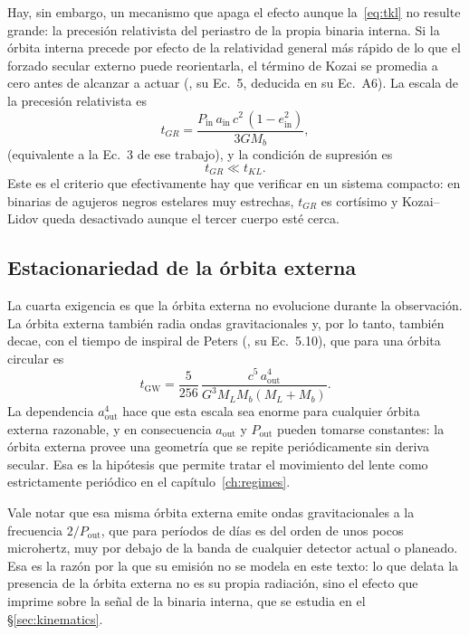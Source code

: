 \documentclass[11pt,a4paper,openany]{book}
\newcommand{\ain}{a_{\mathrm{in}}}
\newcommand{\aout}{a_{\mathrm{out}}}
\begin{document}
Hay, sin embargo, un mecanismo que apaga el efecto aunque
la~\eqref{eq:tkl} no resulte grande: la precesi\'on relativista del periastro
de la propia binaria interna. Si la \'orbita interna precede por efecto de la
relatividad general m\'as r\'apido de lo que el forzado secular externo puede
reorientarla, el t\'ermino de Kozai se promedia a cero antes de alcanzar a
actuar (\citealp{BlaesLeeSocrates2002}, su Ec.~5, deducida en su
Ec.~A6). La escala de la precesi\'on relativista es
\begin{equation}
  t_{GR}=\frac{P_\mathrm{in}\,\ain\,c^{2}\,(1-e_\mathrm{in}^{2})}{3GM_b},
  \label{eq:tgr}
\end{equation}
(equivalente a la Ec.~3 de ese trabajo), y la condici\'on de supresi\'on es
\begin{equation}
  t_{GR}\ll t_{KL}.
  \label{eq:kozai_quench}
\end{equation}
Este es el criterio que efectivamente hay que verificar en un sistema
compacto: en binarias de agujeros negros estelares muy estrechas, $t_{GR}$ es
cort\'isimo y Kozai--Lidov queda desactivado aunque el tercer cuerpo est\'e
cerca.

\subsection*{Estacionariedad de la \'orbita externa}
\label{sub:estacionaria}

La cuarta exigencia es que la \'orbita externa no evolucione durante la
observaci\'on. La \'orbita externa tambi\'en radia ondas gravitacionales y,
por lo tanto, tambi\'en decae, con el tiempo de inspiral de Peters
(\citealp{Peters1964}, su Ec.~5.10), que para una \'orbita circular es
\begin{equation}
  t_\mathrm{GW}=\frac{5}{256}\,
  \frac{c^{5}\,\aout^{4}}{G^{3}M_LM_b(M_L+M_b)} .
  \label{eq:peters}
\end{equation}
La dependencia $\aout^{4}$ hace que esta escala sea enorme para cualquier
\'orbita externa razonable, y en consecuencia $\aout$ y $P_\mathrm{out}$
pueden tomarse constantes: la \'orbita externa provee una geometr\'ia que se
repite peri\'odicamente sin deriva secular. Esa es la hip\'otesis que permite
tratar el movimiento del lente como estrictamente peri\'odico en el
cap\'itulo~\ref{ch:regimes}.

Vale notar que esa misma \'orbita externa emite ondas gravitacionales a la
frecuencia $2/P_\mathrm{out}$, que para per\'iodos de d\'ias es del orden de
unos pocos microhertz, muy por debajo de la banda de cualquier detector actual
o planeado. Esa es la raz\'on por la que su emisi\'on no se modela en este
texto: lo que delata la presencia de la \'orbita externa no es su propia
radiaci\'on, sino el efecto que imprime sobre la se\~nal de la binaria
interna, que se estudia en el \S\ref{sec:kinematics}.
\end{document}
